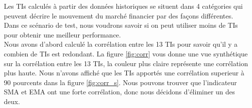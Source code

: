 Les TIs calculés à partir des données historiques se situent dans 4 catégories qui peuvent décrire le mouvement du marché financier par des façons différentes. Dans ce scénario de test, nous voudrons savoir si on peut utiliser moins de TIs pour obtenir une meilleur performance. \\

Nous avons d'abord calculé la corrélation entre les 13 TIs pour savoir qu'il y a combien de TIs est redondant. La figure \ref{fig:corr} vous donne une vue synthétique sur la corrélation entre les 13 TIs, la couleur plus claire représente une corrélation plus haute. Nous n'avons affiché que les TIs apportés une corrélation superieur à 90 pourcents dans la figure \ref{fig:corr_s}. Nous pouvons trouver que l'indicateur SMA et EMA ont une forte corrélation, donc nous décidons d'éliminer un des deux. \\

